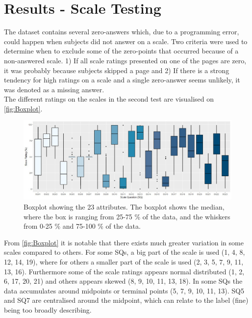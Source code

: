 \section{Results - Scale Testing}
\label{ResultsScaleTesting}
%
The dataset contains several zero-answers which, due to a programming error, could happen when subjects did not answer on a scale. Two criteria were used to determine when to exclude some of the zero-points that occurred because of a non-answered scale. 1) If all scale ratings presented on one of the pages are zero, it was probably because subjects skipped a page and 2) If there is a strong tendency for high ratings on a scale and a single zero-answer seems unlikely, it was denoted as a missing answer.\\

\noindent
The different ratings on the scales in the second test are visualised on \autoref{fig:Boxplot}.
%
%

\begin{figure}[!b]
	\centering
	\includegraphics[width=6.9in]{Figure/Boksplot23.png}
	\hfil
	\caption{Boxplot showing the 23 attributes. The boxplot shows the median, where the box is ranging from 25-75 \% of the data, and the whiskers from 0-25 \% and 75-100 \% of the data.}
	\label{fig:Boxplot}
%	
\end{figure}

%
From \autoref{fig:Boxplot}  it is notable that there exists much greater variation in some scales compared to others. For some SQs, a big part of the scale is used (1, 4, 8, 12, 14, 19), where for others a smaller part of the scale is used (2, 3, 5, 7, 9, 11, 13, 16). Furthermore some of the scale ratings appears normal distributed (1, 2, 6, 17, 20, 21) and others appears skewed (8, 9, 10, 11, 13, 18). In some SQs the data accumulates around midpoints or terminal points (5, 7, 9, 10, 11, 13). SQ5 and SQ7 are centralised around the midpoint, which can relate to the label (fine) being too broadly describing. \\ 

